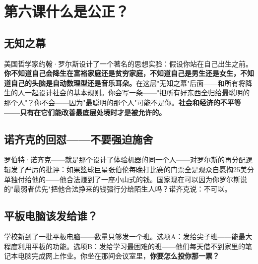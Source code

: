 \documentclass[a4paper,12pt]{ctexart}
\begin{document}
\newpage
\section{\textcolor{orange!80!black}{第六课\quad 什么是公正？}}

\subsection*{无知之幕}

美国哲学家约翰·罗尔斯设计了一个著名的思想实验：假设你站在自己出生之前。\textbf{你不知道自己会降生在富裕家庭还是贫穷家庭，不知道自己是男生还是女生，不知道自己的头脑是自动数理型还是音乐耳朵。}在这层"无知之幕"后面——和所有将降生的人一起设计社会的基本规则。你会写一条——"把所有好东西全归给最聪明的那个人"？你不会——因为"最聪明的那个人"可能不是你。\textbf{社会和经济的不平等——只有在它们能改善最底层处境时才是被允许的。}

\subsection*{诺齐克的回怼——不要强迫施舍}

罗伯特·诺齐克——就是那个设计了体验机器的同一个人——对罗尔斯的再分配逻辑发了严厉的批评：如果篮球巨星张伯伦每晚打比赛的门票全是观众自愿掏25美分单独付给他的——他合法赚到了一座小山式的钱。国家现在可以因为你罗尔斯说的"最弱者优先"把他合法挣来的钱强行分给陌生人吗？诺齐克说：不可以。

\subsection*{平板电脑该发给谁？}

学校新到了一批平板电脑——数量只够发一个班。选项A：发给尖子班——能最大程度利用平板的功能。选项B：发给学习最困难的班——他们每天借不到家里的笔记本电脑完成网上作业。你坐在那间会议室里，\textbf{你要怎么投你那一票？}

\end{document}
